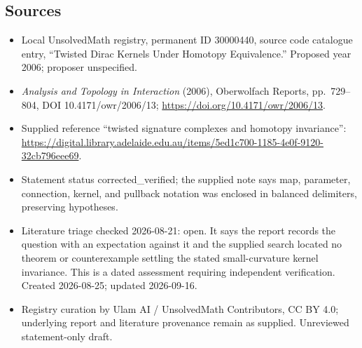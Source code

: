 \documentclass[11pt]{article}
\begin{document}
\subsection{Sources}
\begin{itemize}
\item Local UnsolvedMath registry, permanent ID 30000440, source code catalogue entry, ``Twisted Dirac Kernels Under Homotopy Equivalence.'' Proposed year 2006; proposer unspecified.
\item \emph{Analysis and Topology in Interaction} (2006), Oberwolfach Reports, pp.\ 729--804, DOI 10.4171/owr/2006/13; \url{https://doi.org/10.4171/owr/2006/13}.
\item Supplied reference ``twisted signature complexes and homotopy invariance'': \url{https://digital.library.adelaide.edu.au/items/5ed1c700-1185-4e0f-9120-32cb796eee69}.
\item Statement status corrected\_verified; the supplied note says map, parameter, connection, kernel, and pullback notation was enclosed in balanced delimiters, preserving hypotheses.
\item Literature triage checked 2026-08-21: open. It says the report records the question with an expectation against it and the supplied search located no theorem or counterexample settling the stated small-curvature kernel invariance. This is a dated assessment requiring independent verification. Created 2026-08-25; updated 2026-09-16.
\item Registry curation by Ulam AI / UnsolvedMath Contributors, CC BY 4.0; underlying report and literature provenance remain as supplied. Unreviewed statement-only draft.
\end{itemize}
\end{document}
